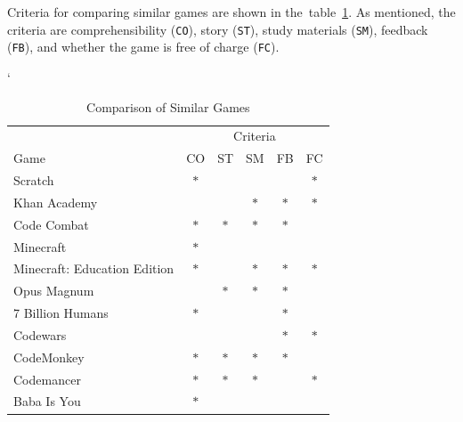 Criteria for comparing similar games are shown in the~table~\ref{table:similargames}.
As mentioned, the criteria are comprehensibility (\texttt{CO}), story (\texttt{ST}), study materials (\texttt{SM}), feedback (\texttt{FB}), and whether the game is free of charge (\texttt{FC}).

\begin{table}[b]
    \catcode`
    \centering
    \begin{tabular}{lccccc}
    \toprule
     & \multicolumn{5}{c}{Criteria} \\
    \cmidrule(l){2-6} 
    \multicolumn{1}{l}{Game} &
        \multicolumn{1}{c}{CO} &
        \multicolumn{1}{c}{ST} &
        \multicolumn{1}{c}{SM} &
        \multicolumn{1}{c}{FB} &
        \multicolumn{1}{c}{FC} \\
    \midrule
                         Scratch                       & $\ast$ &        &        &        & $\ast$ \\
    \rowcolor[gray]{.95} Khan Academy                  &        &        & $\ast$ & $\ast$ & $\ast$ \\
                         Code Combat                   & $\ast$ & $\ast$ & $\ast$ & $\ast$ &        \\
    \rowcolor[gray]{.95} Minecraft                     & $\ast$ &        &        &        &        \\
                         Minecraft: Education Edition   & $\ast$ &        & $\ast$ & $\ast$ & $\ast$ \\
    \rowcolor[gray]{.95} Opus Magnum                   &        & $\ast$ & $\ast$ & $\ast$ &        \\
                         7 Billion Humans              & $\ast$ &        &        & $\ast$ &        \\
    \rowcolor[gray]{.95} Codewars                      &        &        &        & $\ast$ & $\ast$ \\
                         CodeMonkey                    & $\ast$ & $\ast$ & $\ast$ & $\ast$ &        \\
    \rowcolor[gray]{.95} Codemancer                    & $\ast$ & $\ast$ & $\ast$ &        & $\ast$ \\
                         Baba Is You                   & $\ast$ &        &        &        &        \\
    \bottomrule
    \end{tabular}
    \caption{Comparison of Similar Games}
    \label{table:similargames}
\end{table}